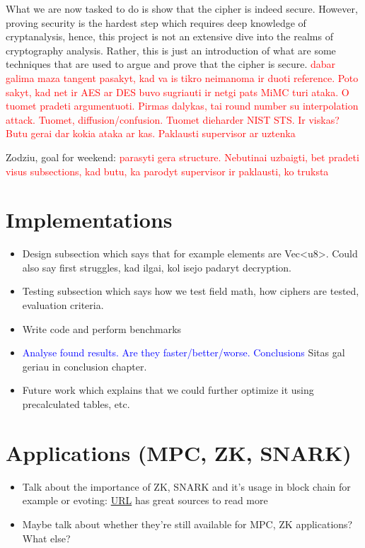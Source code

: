 \documentclass{Resources/UoBLab1}
\theoremstyle{definition}
\begin{document}
What we are now tasked to do is show that the cipher is indeed secure. However, proving security is the hardest step which requires deep knowledge of cryptanalysis, hence, this project is not an extensive dive into the realms of cryptography analysis. Rather, this is just an introduction of what are some techniques that are used to argue and prove that the cipher is secure. \textcolor{red}{dabar galima maza tangent pasakyt, kad va is tikro neimanoma ir duoti reference. Poto sakyt, kad net ir AES ar DES buvo sugriauti ir netgi pats MiMC turi ataka. O tuomet pradeti argumentuoti. Pirmas dalykas, tai round number su interpolation attack. Tuomet, diffusion/confusion. Tuomet dieharder NIST STS. Ir viskas? Butu gerai dar kokia ataka ar kas. Paklausti supervisor ar uztenka}

Zodziu, goal for weekend: \textcolor{red}{parasyti gera structure. Nebutinai uzbaigti, bet pradeti visus subsections, kad butu, ka parodyt supervisor ir paklausti, ko truksta}



\section{Implementations}\label{chapter:Implementations}
\begin{itemize}
    \item Design subsection which says that for example elements are Vec<u8>. Could also say first struggles, kad ilgai, kol isejo padaryt decryption.
    \item Testing subsection which says how we test field math, how ciphers are tested, evaluation criteria.
    \item Write code and perform benchmarks
    \item \textcolor{blue}{Analyse found results. Are they faster/better/worse. Conclusions} Sitas gal geriau in conclusion chapter.
    \item Future work which explains that we could further optimize it using precalculated tables, etc.
\end{itemize}


\section{Applications (MPC, ZK, SNARK)}
\begin{itemize}
    \item Talk about the importance of ZK, SNARK and it's usage in block chain for example or evoting: \href{https://ethereum.org/en/zero-knowledge-proofs/}{URL} has great sources to read more
    \item Maybe talk about whether they're still available for MPC, ZK applications? What else?
\end{itemize}
\end{document}
